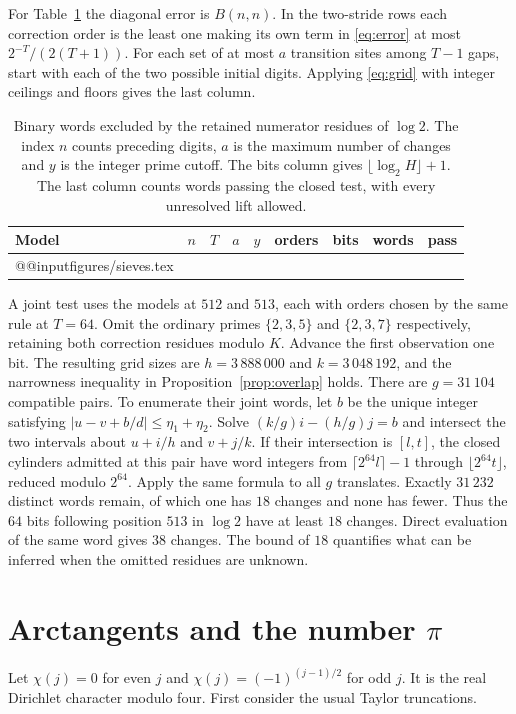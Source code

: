 \documentclass[11pt]{article}
\makeatletter
\newcommand{\inputrows}[1]{\csname @@input\endcsname #1 }
\makeatother
\begin{document}
For Table~\ref{tab:words} the diagonal error is $B(n,n)$. In the two-stride
rows each correction order is the least one making its own term in
\eqref{eq:error} at most $2^{-T}/(2(T+1))$. For each set of at most $a$
transition sites among $T-1$ gaps, start with each of the two possible
initial digits. Applying \eqref{eq:grid} with integer ceilings and floors
gives the last column.

\begin{table}[H]
\centering\small
\caption{Binary words excluded by the retained numerator residues of $\log 2$. The index $n$ counts preceding digits,
$a$ is the maximum number of changes and $y$ is the integer prime cutoff.
The bits column gives $\lfloor\log_2 H\rfloor+1$. The last column counts words
passing the closed test, with every unresolved lift allowed.}\label{tab:words}\smallskip
\begin{tabular}{lrrrrrrrr}\toprule
Model & $n$ & $T$ & $a$ & $y$ & orders & bits & words & pass\\\midrule
\inputrows{figures/sieves.tex}
\bottomrule\end{tabular}
\end{table}

A joint test uses the models at $512$ and $513$, each with orders chosen by
the same rule at $T=64$. Omit the ordinary primes $\{2,3,5\}$ and
$\{2,3,7\}$ respectively, retaining both correction residues modulo $K$.
Advance the first observation one bit. The resulting grid sizes are
$h=3\,888\,000$ and $k=3\,048\,192$, and the narrowness inequality in
Proposition~\ref{prop:overlap} holds. There are $g=31\,104$ compatible pairs.
To enumerate their joint words, let $b$ be the unique integer satisfying
$|u-v+b/d|\le\eta_1+\eta_2$. Solve
$(k/g)i-(h/g)j=b$ and intersect the two intervals about $u+i/h$ and $v+j/k$.
If their intersection is $[l,t]$, the closed cylinders admitted at this pair
have word integers from $\lceil2^{64}l\rceil-1$ through $\lfloor2^{64}t\rfloor$,
reduced modulo $2^{64}$. Apply the same formula to all $g$ translates.
Exactly $31\,232$ distinct words remain, of which one has $18$ changes
and none has fewer. Thus the $64$ bits following position $513$ in $\log 2$
have at least $18$ changes. Direct evaluation of the same word gives $38$ changes. The bound of $18$ quantifies what can be inferred when the omitted residues are unknown.

\section{Arctangents and the number \texorpdfstring{$\pi$}{pi}}\label{sec:angles}
Let $\chi(j)=0$ for even $j$ and $\chi(j)=(-1)^{(j-1)/2}$ for odd $j$.
It is the real Dirichlet character modulo four. First consider the usual
Taylor truncations.
\end{document}
